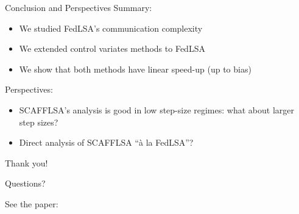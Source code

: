 \documentclass[aspectratio=169,14pt]{beamer}
\begin{document}
  


  \begin{frame}{Conclusion and Perspectives}
    Summary:
    \begin{itemize}
    \item We studied FedLSA's communication complexity
    \item We extended control variates methods to FedLSA
    \item We show that both methods have linear speed-up (up to bias)
    \end{itemize}

    Perspectives:
    \begin{itemize}
    \item SCAFFLSA's analysis is good in low step-size regimes: what about larger step sizes?
    \item Direct analysis of SCAFFLSA ``à la FedLSA''?
    \end{itemize}
  \end{frame}

  \begin{frame}
    \begin{center}
      \LARGE Thank you!

      \normalsize Questions?
    \end{center}
    

    \small
    See the paper:

    ~~
  \end{frame}
\end{document}
